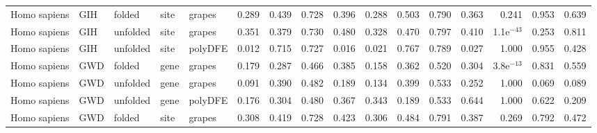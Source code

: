 \begin{longtable}{lllllrrrrrrrrrrr}
        Homo sapiens &                       GIH &    folded &  site &   grapes &                              0.289 &                               0.439 &                 0.728 &                 0.396 &                              0.288 &                               0.503 &                 0.790 &                 0.363 &         0.241 &  0.953 &  0.639 \\
        Homo sapiens &                       GIH &  unfolded &  site &   grapes &                              0.351 &                               0.379 &                 0.730 &                 0.480 &                              0.328 &                               0.470 &                 0.797 &                 0.410 &  1.1e$^{-43}$ &  0.253 &  0.811 \\
        Homo sapiens &                       GIH &  unfolded &  site &  polyDFE &                              0.012 &                               0.715 &                 0.727 &                 0.016 &                              0.021 &                               0.767 &                 0.789 &                 0.027 &         1.000 &  0.955 &  0.428 \\
        Homo sapiens &                       GWD &    folded &  gene &   grapes &                              0.179 &                               0.287 &                 0.466 &                 0.385 &                              0.158 &                               0.362 &                 0.520 &                 0.304 &  3.8e$^{-13}$ &  0.831 &  0.559 \\
        Homo sapiens &                       GWD &  unfolded &  gene &   grapes &                              0.091 &                               0.390 &                 0.482 &                 0.189 &                              0.134 &                               0.399 &                 0.533 &                 0.252 &         1.000 &  0.069 &  0.089 \\
        Homo sapiens &                       GWD &  unfolded &  gene &  polyDFE &                              0.176 &                               0.304 &                 0.480 &                 0.367 &                              0.343 &                               0.189 &                 0.533 &                 0.644 &         1.000 &  0.622 &  0.209 \\
        Homo sapiens &                       GWD &    folded &  site &   grapes &                              0.308 &                               0.419 &                 0.728 &                 0.423 &                              0.306 &                               0.484 &                 0.791 &                 0.387 &         0.269 &  0.792 &  0.472 \\

\end{longtable}
